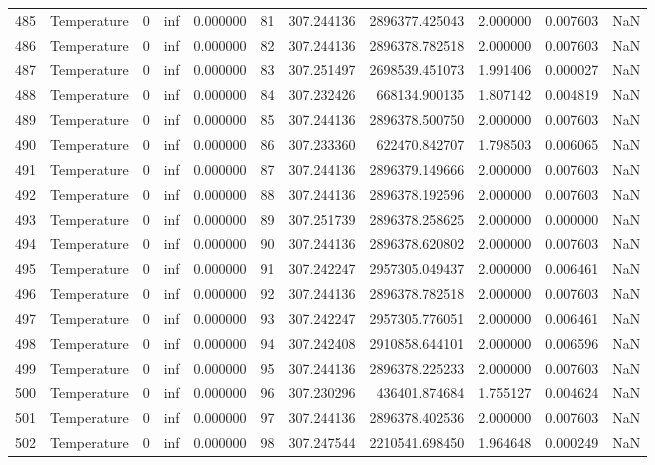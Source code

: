 \begin{tabular}{llrrrrrrrrr}
485 & Temperature & 0 & inf & 0.000000 & 81 & 307.244136 & 2896377.425043 & 2.000000 & 0.007603 & NaN \\
486 & Temperature & 0 & inf & 0.000000 & 82 & 307.244136 & 2896378.782518 & 2.000000 & 0.007603 & NaN \\
487 & Temperature & 0 & inf & 0.000000 & 83 & 307.251497 & 2698539.451073 & 1.991406 & 0.000027 & NaN \\
488 & Temperature & 0 & inf & 0.000000 & 84 & 307.232426 & 668134.900135 & 1.807142 & 0.004819 & NaN \\
489 & Temperature & 0 & inf & 0.000000 & 85 & 307.244136 & 2896378.500750 & 2.000000 & 0.007603 & NaN \\
490 & Temperature & 0 & inf & 0.000000 & 86 & 307.233360 & 622470.842707 & 1.798503 & 0.006065 & NaN \\
491 & Temperature & 0 & inf & 0.000000 & 87 & 307.244136 & 2896379.149666 & 2.000000 & 0.007603 & NaN \\
492 & Temperature & 0 & inf & 0.000000 & 88 & 307.244136 & 2896378.192596 & 2.000000 & 0.007603 & NaN \\
493 & Temperature & 0 & inf & 0.000000 & 89 & 307.251739 & 2896378.258625 & 2.000000 & 0.000000 & NaN \\
494 & Temperature & 0 & inf & 0.000000 & 90 & 307.244136 & 2896378.620802 & 2.000000 & 0.007603 & NaN \\
495 & Temperature & 0 & inf & 0.000000 & 91 & 307.242247 & 2957305.049437 & 2.000000 & 0.006461 & NaN \\
496 & Temperature & 0 & inf & 0.000000 & 92 & 307.244136 & 2896378.782518 & 2.000000 & 0.007603 & NaN \\
497 & Temperature & 0 & inf & 0.000000 & 93 & 307.242247 & 2957305.776051 & 2.000000 & 0.006461 & NaN \\
498 & Temperature & 0 & inf & 0.000000 & 94 & 307.242408 & 2910858.644101 & 2.000000 & 0.006596 & NaN \\
499 & Temperature & 0 & inf & 0.000000 & 95 & 307.244136 & 2896378.225233 & 2.000000 & 0.007603 & NaN \\
500 & Temperature & 0 & inf & 0.000000 & 96 & 307.230296 & 436401.874684 & 1.755127 & 0.004624 & NaN \\
501 & Temperature & 0 & inf & 0.000000 & 97 & 307.244136 & 2896378.402536 & 2.000000 & 0.007603 & NaN \\
502 & Temperature & 0 & inf & 0.000000 & 98 & 307.247544 & 2210541.698450 & 1.964648 & 0.000249 & NaN \\

\end{tabular}
